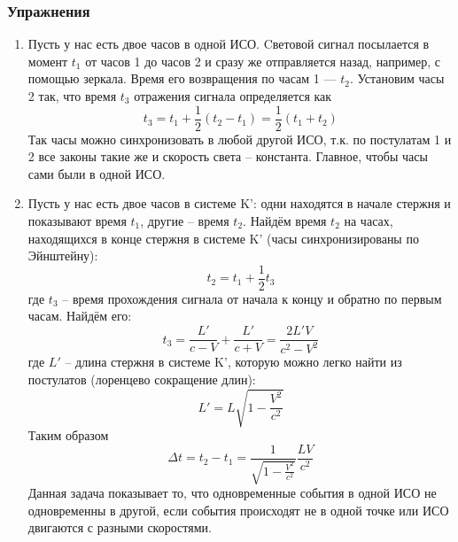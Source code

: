 \documentclass[12pt]{article}
\begin{document}
\begin{enumerate}
\end{enumerate}
\subsubsection{Упражнения}
\begin{enumerate}
    \item Пусть у нас есть двое часов в одной ИСО. Cветовой сигнал посылается в момент $t_1$ от часов 1 до часов 2 и сразу же отправляется назад, например, с помощью зеркала. Время его возвращения по часам 1 — $t_2$. Установим часы 2 так, что время $t_3$ отражения сигнала определяется как
    \begin{equation}
        t_3 = t_1 + \frac{1}{2}(t_2-t_1) = \frac{1}{2}(t_1+t_2)
    \end{equation}
    Так часы можно синхронизовать в любой другой ИСО, т.к. по постулатам 1 и 2 все законы такие же и скорость света -- константа. Главное, чтобы часы сами были в одной ИСО.
    \item Пусть у нас есть двое часов в системе K': одни находятся в начале стержня и показывают время $t_1$, другие -- время $t_2$. Найдём время $t_2$ на часах, находящихся в конце стержня в системе K' (часы синхронизированы по Эйнштейну):
    \begin{equation}
        t_2=t_1+\frac{1}{2}t_3
    \end{equation}
    где $t_3$ -- время прохождения сигнала от начала к концу и обратно по первым часам. Найдём его:
    \begin{equation}
        t_3 = \frac{L'}{c-V}+\frac{L'}{c+V}=\frac{2L'V}{c^2-V^2}
    \end{equation}
    где $L'$ -- длина стержня в системе K', которую можно легко найти из постулатов (лоренцево сокращение длин):
    \begin{equation}
        L'=L\sqrt{1-\frac{V^2}{c^2}}
    \end{equation}
    Таким образом
    \begin{equation}
        \Delta t = t_2 - t_1 = \frac{1}{\sqrt{1-\frac{V^2}{c^2}}}\frac{LV}{c^2}
    \end{equation}
    Данная задача показывает то, что одновременные события в одной ИСО не одновременны в другой, если события происходят не в одной точке или ИСО двигаются с разными скоростями.
\end{enumerate}
\end{document}
